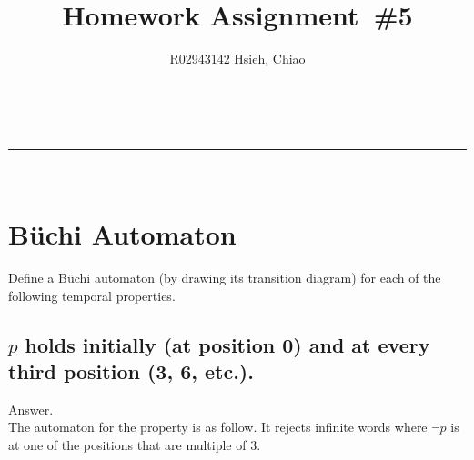 \documentclass[a4paper,11pt]{article}
\makeatletter
\newcommand{\linia}{\rule{\linewidth}{0.5pt}}
\theoremstyle{mytheor}
\renewcommand{\maketitle}{
\begin{center}
\vspace{2ex}
{\huge \textsc{\@title}}
\vspace{1ex}
\\
\linia\\
\@author \hfill \@date
\vspace{4ex}
\end{center}
}
\makeatother
\begin{document}
\title{Homework Assignment~\#5}

\author{R02943142 Hsieh, Chiao}

\maketitle

\section{B\"uchi Automaton}
Define a B\"uchi automaton (by drawing its transition diagram) for each of the following temporal properties.

\subsection{$p$ holds initially (at position 0) and at every third position (3, 6, etc.).}
Answer.
\smallskip \\
The automaton for the property is as follow. It rejects infinite words where $\neg p$ is at one of the positions that are multiple of 3.
\begin{center}
\end{center}
\end{document}
